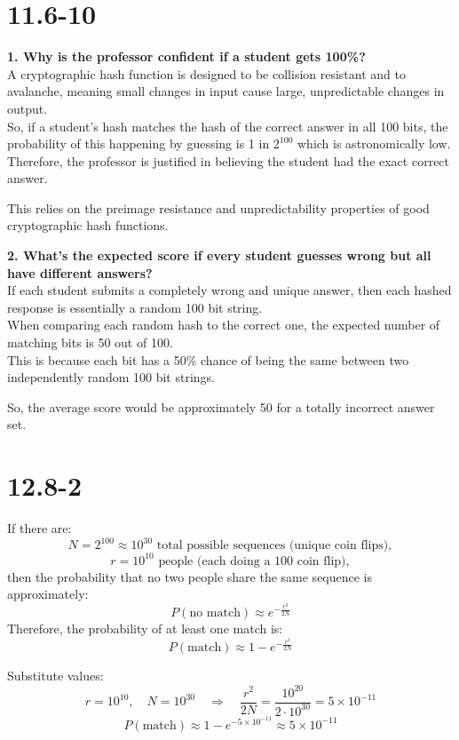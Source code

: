 \documentclass[12pt]{article}
\begin{document}
\section*{11.6-10}
\textbf{1. Why is the professor confident if a student gets 100\%?} \\
A cryptographic hash function is designed to be collision resistant and to avalanche, meaning small changes in input cause large, unpredictable changes in output. \\
So, if a student's hash matches the hash of the correct answer in all 100 bits, the probability of this happening by guessing is 1 in \( 2^{100} \) which is astronomically low. \\
Therefore, the professor is justified in believing the student had the exact correct answer.

This relies on the preimage resistance and unpredictability properties of good cryptographic hash functions.

\textbf{2. What's the expected score if every student guesses wrong but all have different answers?} \\
If each student submits a completely wrong and unique answer, then each hashed response is essentially a random 100 bit string. \\
When comparing each random hash to the correct one, the expected number of matching bits is 50 out of 100. \\
This is because each bit has a 50\% chance of being the same between two independently random 100 bit strings.

So, the average score would be approximately 50 for a totally incorrect answer set.
\newpage
\section*{12.8-2}
If there are:
\[
N = 2^{100} \approx 10^{30} \text{ total possible sequences (unique coin flips)},
\]
\[
r = 10^{10} \text{ people (each doing a 100 coin flip)},
\]
then the probability that no two people share the same sequence is approximately:
\[
P(\text{no match}) \approx e^{-\frac{r^2}{2N}}
\]
Therefore, the probability of at least one match is:
\[
P(\text{match}) \approx 1 - e^{-\frac{r^2}{2N}}
\]

Substitute values:
\[
r = 10^{10}, \quad N = 10^{30} \quad \Rightarrow \quad \frac{r^2}{2N} = \frac{10^{20}}{2 \cdot 10^{30}} = 5 \times 10^{-11}
\]
\[
P(\text{match}) \approx 1 - e^{-5 \times 10^{-11}} \approx 5 \times 10^{-11}
\]
\end{document}
